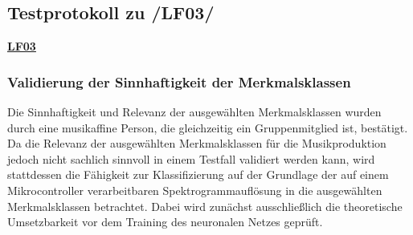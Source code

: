 \subsection{Testprotokoll zu /LF03/}
\label{sec:nn-test-protocol}

\textbf{\hyperlink{lf-nn-01}{LF03}}

\subsubsection{Validierung der Sinnhaftigkeit der Merkmalsklassen}
Die Sinnhaftigkeit und Relevanz der ausgewählten Merkmalsklassen wurden durch eine musikaffine Person, die gleichzeitig ein Gruppenmitglied ist, bestätigt.
Da die Relevanz der ausgewählten Merkmalsklassen für die Musikproduktion jedoch nicht sachlich sinnvoll in einem Testfall validiert werden kann, wird stattdessen die Fähigkeit zur Klassifizierung auf der Grundlage der auf einem Mikrocontroller verarbeitbaren Spektrogrammauflösung in die ausgewählten Merkmalsklassen betrachtet. Dabei wird zunächst ausschließlich die theoretische Umsetzbarkeit vor dem Training des neuronalen Netzes geprüft.


